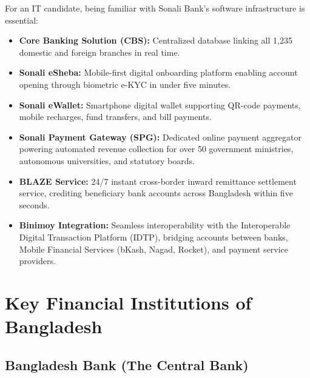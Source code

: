 For an IT candidate, being familiar with Sonali Bank's software infrastructure is essential:

\begin{itemize}
  \item \textbf{Core Banking Solution (CBS):} Centralized database linking all 1,235 domestic and foreign branches in real time.
  \item \textbf{Sonali eSheba:} Mobile-first digital onboarding platform enabling account opening through biometric e-KYC in under five minutes.
  \item \textbf{Sonali eWallet:} Smartphone digital wallet supporting QR-code payments, mobile recharges, fund transfers, and bill payments.
  \item \textbf{Sonali Payment Gateway (SPG):} Dedicated online payment aggregator powering automated revenue collection for over 50 government ministries, autonomous universities, and statutory boards.
  \item \textbf{BLAZE Service:} 24/7 instant cross-border inward remittance settlement service, crediting beneficiary bank accounts across Bangladesh within five seconds.
  \item \textbf{Binimoy Integration:} Seamless interoperability with the Interoperable Digital Transaction Platform (IDTP), bridging accounts between banks, Mobile Financial Services (bKash, Nagad, Rocket), and payment service providers.
\end{itemize}

\medskip

\section{Key Financial Institutions of Bangladesh}

\subsection{Bangladesh Bank (The Central Bank)}


